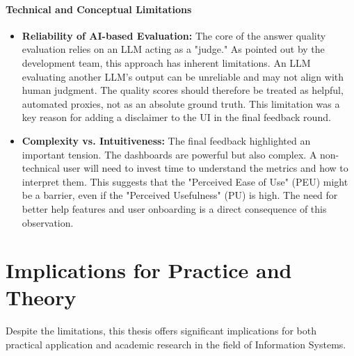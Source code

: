 \documentclass[
	english,
	ruledheaders=section,%
	class=report,%
	thesis={type=bachelor},%
	accentcolor=1b,%
	custommargins=true,%
	marginpar=false,%
	parskip=half-,%
	fontsize=11pt,%
	DIV=14,
]{tudapub}
\begin{document}
\paragraph{Technical and Conceptual Limitations}
\begin{itemize}
    \item \textbf{Reliability of AI-based Evaluation:} The core of the answer quality evaluation relies on an LLM acting as a "judge." As pointed out by the development team, this approach has inherent limitations. An LLM evaluating another LLM's output can be unreliable and may not align with human judgment. The quality scores should therefore be treated as helpful, automated proxies, not as an absolute ground truth. This limitation was a key reason for adding a disclaimer to the UI in the final feedback round.
    \item \textbf{Complexity vs. Intuitiveness:} The final feedback highlighted an important tension. The dashboards are powerful but also complex. A non-technical user will need to invest time to understand the metrics and how to interpret them. This suggests that the "Perceived Ease of Use" (PEU) might be a barrier, even if the "Perceived Usefulness" (PU) is high. The need for better help features and user onboarding is a direct consequence of this observation.
\end{itemize}

\section{Implications for Practice and Theory}
Despite the limitations, this thesis offers significant implications for both practical application and academic research in the field of Information Systems.
\end{document}
